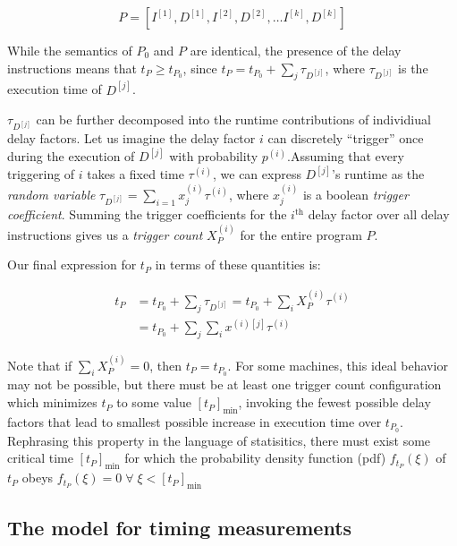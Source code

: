 \documentclass[conference]{IEEEtran}
\begin{document}
\begin{equation}
    P = \left[I^{[1]}, D^{[1]}, I^{[2]}, D^{[2]}, \dots I^{[k]}, D^{[k]}\right]
\end{equation}

While the semantics of $P_0$ and $P$ are identical, the presence of the delay instructions
means that $t_P \ge t_{P_0}$, since $t_P = t_{P_0} + \sum_{j} \tau_{D^{[j]}}$, where
$\tau_{D^{[j]}}$ is the execution time of $D^{[j]}$.

$\tau_{D^{[j]}}$ can be further decomposed into the runtime contributions of individiual
delay factors. Let us imagine the delay factor $i$ can discretely ``trigger'' once during
the execution of $D^{[j]}$ with probability $p^{(i)}$.Assuming that every triggering of $i$
takes a fixed time $\tau^{(i)}$, we can express $D^{[j]}$'s runtime as the \textit{random
variable} $\tau_{D^{[j]}} = \sum_{i=1} x^{(i)}_j \tau^{(i)}$, where $x^{(i)}_j$ is a boolean
\textit{trigger coefficient}. Summing the trigger coefficients for the $i^{\textrm{th}}$
delay factor over all delay instructions gives us a \textit{trigger count}
$X_P^{(i)}$ for the entire program $P$.

Our final expression for $t_P$ in terms of these quantities is:

\begin{align}
t_P &= t_{P_0} + \sum_{j} \tau_{D^{[j]}} = t_{P_0} + \sum_{i} X_P^{(i)} \tau^{(i)} \\
    &= t_{P_0} + \sum_{j} \sum_{i} x^{(i)[j]} \tau^{(i)}
\end{align}


Note that if $\sum_{i} X_P^{(i)} = 0$, then $t_P = t_{P_0}$. For some machines, this ideal
behavior may not be possible, but there must be at least one trigger count configuration
which minimizes $t_P$ to some value $[t_P]_{\textrm{min}}$, invoking the fewest possible
delay factors that lead to smallest possible increase in execution time over $t_{P_0}$.
Rephrasing this property in the language of statisitics, there must exist some critical time
$[t_P]_{\textrm{min}}$ for which the probability density function (pdf) $f_{t_P}(\xi)$ of
$t_P$ obeys $f_{t_P}(\xi) = 0 \; \forall \; \xi < [t_P]_{\textrm{min}}$

\subsection{The model for timing measurements}
\end{document}
